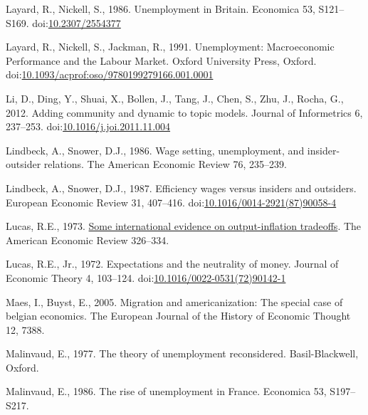 \documentclass[
  12pt,
  onecolumn]{article}
\newlength{\cslhangindent}
\newlength{\cslentryspacingunit} %
\newenvironment{CSLReferences}[2] %
 {%
  \setlength{\parindent}{0pt}
  \ifodd #1
  \let\oldpar\par
  \def\par{\hangindent=\cslhangindent\oldpar}
  \fi
  \setlength{\parskip}{#2\cslentryspacingunit}
 }%
 {}
\begin{document}
\begin{CSLReferences}{1}{0}
\leavevmode{}%
Layard, R., Nickell, S., 1986. Unemployment in {Britain}. Economica 53,
S121--S169. doi:\href{https://doi.org/10.2307/2554377}{10.2307/2554377}

\leavevmode{}%
Layard, R., Nickell, S., Jackman, R., 1991. Unemployment: {Macroeconomic
Performance} and the {Labour Market}. {Oxford University Press},
{Oxford}.
doi:\href{https://doi.org/10.1093/acprof:oso/9780199279166.001.0001}{10.1093/acprof:oso/9780199279166.001.0001}

\leavevmode{}%
Li, D., Ding, Y., Shuai, X., Bollen, J., Tang, J., Chen, S., Zhu, J.,
Rocha, G., 2012. Adding community and dynamic to topic models. Journal
of Informetrics 6, 237--253.
doi:\href{https://doi.org/10.1016/j.joi.2011.11.004}{10.1016/j.joi.2011.11.004}

\leavevmode{}%
Lindbeck, A., Snower, D.J., 1986. Wage setting, unemployment, and
insider-outsider relations. The American Economic Review 76, 235--239.

\leavevmode{}%
Lindbeck, A., Snower, D.J., 1987. Efficiency wages versus insiders and
outsiders. European Economic Review 31, 407--416.
doi:\href{https://doi.org/10.1016/0014-2921(87)90058-4}{10.1016/0014-2921(87)90058-4}

\leavevmode{}%
Lucas, R.E., 1973. \href{http://www.jstor.org/stable/1914364}{Some
international evidence on output-inflation tradeoffs}. The American
Economic Review 326--334.

\leavevmode{}%
Lucas, R.E., Jr., 1972. Expectations and the neutrality of money.
Journal of Economic Theory 4, 103--124.
doi:\href{https://doi.org/10.1016/0022-0531(72)90142-1}{10.1016/0022-0531(72)90142-1}

\leavevmode{}%
Maes, I., Buyst, E., 2005. Migration and americanization: The special
case of belgian economics. The European Journal of the History of
Economic Thought 12, 7388.

\leavevmode{}%
Malinvaud, E., 1977. The theory of unemployment reconsidered.
{Basil-Blackwell}, {Oxford}.

\leavevmode{}%
Malinvaud, E., 1986. The rise of unemployment in {France}. Economica 53,
S197--S217.


\end{CSLReferences}
\end{document}
